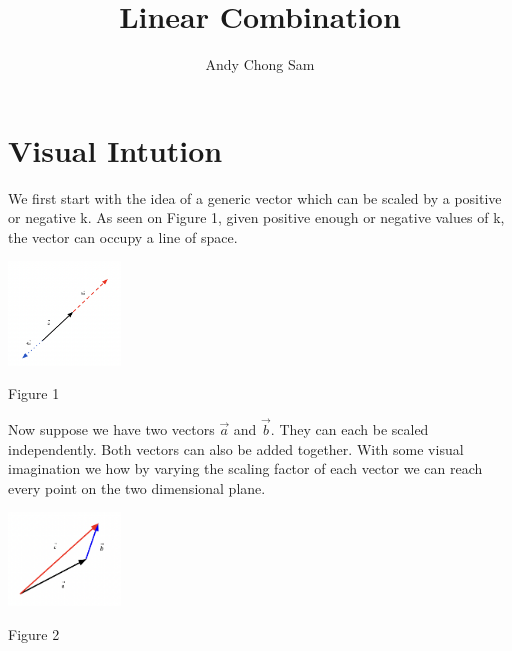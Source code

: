 \documentclass{article}
\begin{document}
	
\title{Linear Combination}
\author{Andy Chong Sam}

\maketitle	

\section{Visual Intution}
\begin{minipage}[c]{.5\linewidth}
	\par \noindent We first start with the idea of a generic vector which can be scaled by a positive or negative k. As seen on Figure 1, given positive enough or negative values of k, the vector can occupy a line of space.
\end{minipage}%
\begin{minipage}[c]{.5\linewidth}
\begin{center}
	\includegraphics[width=3cm]{matrix-scaling-1.png}
\end{center}
\begin{center}
	Figure 1	
\end{center}
\end{minipage}
\linebreak
\linebreak
\linebreak
\begin{minipage}[c]{.5\linewidth}
	\par \noindent Now suppose we have two vectors \( \vec a \) and \( \vec b \).  They can each be scaled independently. Both vectors can also be added together. With some visual imagination we how by varying the scaling factor of each vector we can reach every point on the two dimensional plane.
\end{minipage}%
\begin{minipage}[c]{.5\linewidth}
\begin{center}
	\includegraphics[width=3cm]{vector-scaling-2.png}
\end{center}
\begin{center}
	Figure 2	
\end{center}
\end{minipage}
\end{document}
